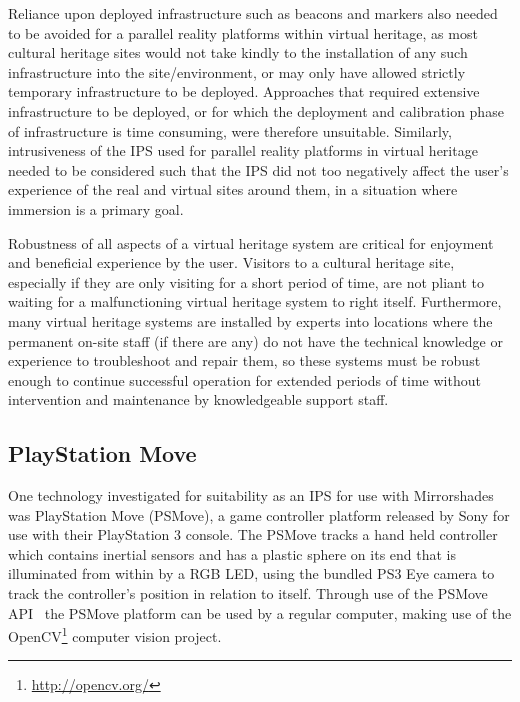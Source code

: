 Reliance upon deployed infrastructure such as beacons and markers also needed to be avoided for a parallel reality platforms within virtual heritage, as most cultural heritage sites would not take kindly to the installation of any such infrastructure into the site/environment, or may only have allowed strictly temporary infrastructure to be deployed. Approaches that required extensive infrastructure to be deployed, or for which the deployment and calibration phase of infrastructure is time consuming, were therefore unsuitable. Similarly, intrusiveness of the IPS used for parallel reality platforms in virtual heritage needed to be considered such that the IPS did not too negatively affect the user's experience of the real and virtual sites around them, in a situation where immersion is a primary goal.

Robustness of all aspects of a virtual heritage system are critical for enjoyment and beneficial experience by the user. Visitors to a cultural heritage site, especially if they are only visiting for a short period of time, are not pliant to waiting for a malfunctioning virtual heritage system to right itself. Furthermore, many virtual heritage systems are installed by experts into locations where the permanent on-site staff (if there are any) do not have the technical knowledge or experience to troubleshoot and repair them, so these systems must be robust enough to continue successful operation for extended periods of time without intervention and maintenance by knowledgeable support staff.



\subsection{PlayStation Move}
\label{psmove}
One technology investigated for suitability as an IPS for use with Mirrorshades was PlayStation Move (PSMove), a game controller platform released by Sony for use with their PlayStation 3 console. The PSMove tracks a hand held controller which contains inertial sensors and has a plastic sphere on its end that is illuminated from within by a RGB LED, using the bundled PS3 Eye camera to track the controller's position in relation to itself. Through use of the PSMove API~\cite{Perl2012} the PSMove platform can be used by a regular computer, making use of the OpenCV\footnote{\url{http://opencv.org/}} computer vision project.

